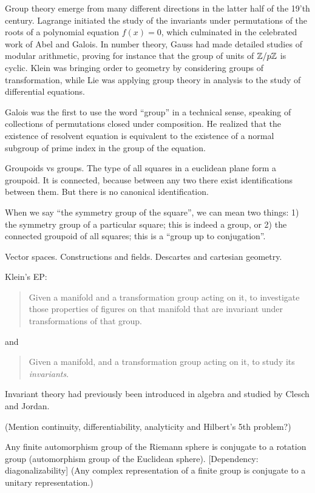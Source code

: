 
Group theory emerge from many different directions in the latter half of the 19'th century.
Lagrange initiated the study of the invariants under permutations
of the roots of a polynomial equation $f(x)=0$,
which culminated in the celebrated work of Abel and Galois.
In number theory, Gauss had made detailed studies of modular arithmetic,
proving for instance that the group of units of $\mathbb{Z}/p\mathbb{Z}$ is cyclic.
Klein was bringing order to geometry by considering groups of transformation,
while Lie was applying group theory in analysis to the study of differential equations.

Galois was the first to use the word ``group'' in a technical sense,
speaking of collections of permutations closed under composition.
He realized that the existence of resolvent equation is equivalent
to the existence of a normal subgroup of prime index
in the group of the equation.

Groupoids vs groups.
The type of all squares in a euclidean plane form a groupoid.
It is connected,
because between any two there exist identifications between them.
But there is no canonical identification.

When we say ``the symmetry group of the square'',
we can mean two things:
1) the symmetry group of a particular square;
this is indeed a group,
or 2) the connected groupoid of all squares;
this is a ``group up to conjugation''.

Vector spaces. Constructions and fields. Descartes and cartesian geometry.

Klein's EP:
\begin{quote}
  Given a manifold and a transformation group acting on it,
  to investigate those properties of figures on that manifold
  that are invariant under transformations of that group.
\end{quote}
and
\begin{quote}
  Given a manifold, and a transformation group acting on it,
  to study its \emph{invariants}.
\end{quote}
Invariant theory had previously been introduced in algebra
and studied by Clesch and Jordan.

(Mention continuity, differentiability, analyticity and Hilbert's 5th problem?)

Any finite automorphism group of the Riemann sphere is conjugate to a
rotation group (automorphism group of the Euclidean sphere).
[Dependency: diagonalizability] (Any complex representation of a
finite group is conjugate to a unitary representation.)

